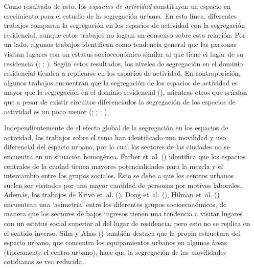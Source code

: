 \documentclass[
  spanish,
  a4paper,%
  chapterprefix=true,%
  DIV=calc,%
  twoside]{scrbook}%
\begin{document}
Como resultado de esto, los \emph{espacios de actividad} constituyen un
espacio en crecimiento para el estudio de la segregación urbana. En esta
línea, diferentes trabajos comparan la segregación en los espacios de
actividad con la segregación residencial, aunque estos trabajos no
logran un consenso sobre esta relación. Por un lado, algunos trabajos
identifican como tendencia general que las personas visitan lugares con
un estatus socioeconómico similar al que tiene el lugar de su residencia
(; ; ). Según estos resultados, los
niveles de segregación en el dominio residencial tienden a replicarse en
los espacios de actividad. En contraposición, algunos trabajos
encuentran que la segregación de los espacios de actividad es mayor que
la segregación en el dominio residencial (), mientras otros que
señalan que a pesar de existir circuitos diferenciados la segregación de
los espacios de actividad es un poco menor (; ; ; ).

Independientemente de el efecto global de la segregación en los espacios
de actividad, los trabajos sobre el tema han identificado una movilidad
y uso diferencial del espacio urbano, por lo cual los sectores de las
ciudades no se encuentra en un situación homogénea. Farber et~al. ()
identifica que los espacios centrales de la ciudad tienen mayores
potencialidades para la mezcla y el intercambio entre los grupos
sociales. Esto se debe a que los centros urbanos suelen ser visitados
por una mayor cantidad de personas por motivos laborales. Además, los
trabajos de Krivo et~al. (), Dong et~al. (), Hilman et~al. () encuentran una
`asimetría' entre los diferentes grupos socioeconómicos, de manera que
los sectores de bajos ingresos tienen una tendencia a visitar lugares
con un estatus social superior al del lugar de residencia, pero esto no
se replica en el sentido inverso. Silm y Ahas () también destaca que la
propia estructura del espacio urbano, que concentra los equipamientos
urbanos en algunas áreas (típicamente el centro urbano), hace que la
segregación de las movilidades cotidianas se vea reducida.
\end{document}
